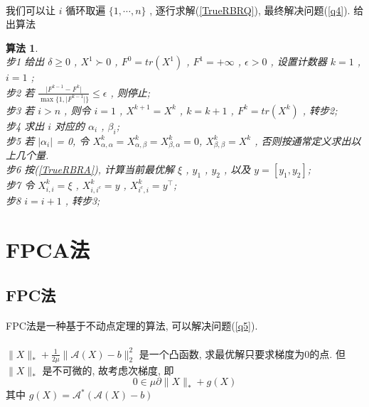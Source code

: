 \documentclass[a4paper, UTF8]{ctexart}				%
\newtheorem{algo}{\bf 算法}
\numberwithin{equation}{section}				%
\begin{document}
			\paragraph{}
				\quad 我们可以让 $i$ 循环取遍 $\{1, \cdots, n\}$ , 逐行求解(\ref{TrueRBRQ}), 最终解决问题(\ref{q4}). 给出算法
				\begin{algo}
					\quad\\
					步1 \quad 给出 $\delta \ge 0$ , $X^1 \succ 0$ , $F^0 = tr(X^1)$ , $F^1 = + \infty$ , $\epsilon > 0$ , 设置计数器 $k = 1$ , $i = 1$ ;\\
					步2 \quad 若 $\frac{\lvert{F^{k - 1}-F^k}\rvert}{\max\{1,\lvert{F^{k - 1}}\rvert\}}\leq\epsilon$ , 则停止;\\
					步3 \quad 若 $i>n$ , 则令 $i=1$ , $X^{k + 1}=X^k$ , $k=k + 1$ , $F^k = tr(X^k)$ , 转步2;\\
					步4 \quad 求出 $i$ 对应的 $\alpha_i$ , $\beta_i$;\\
					步5 \quad 若 $\vert{\alpha_i}\vert$ = 0, 令 $X^k_{\alpha, \alpha} = X^k_{\alpha, \beta} = X^k_{\beta, \alpha} = 0$, $X^k_{\beta, \beta} = X^k$ , 否则按通常定义求出以上几个量.\\
					步6 \quad 按(\ref{TrueRBRA}), 计算当前最优解 $\xi$ , $y_1$ , $y_2$ , 以及 $y = [y_1, y_2]$;\\
					步7 \quad 令 $X^{k}_{i, i} = \xi$ , $X^{k}_{i, i^c} = y$ , $X^{k}_{i^c, i} = y^\top$;\\
					步8 \quad $i = i + 1$ , 转步3;
				\end{algo}


		\section{FPCA法}
		\subsection{FPC法}
			\paragraph{}
				\quad FPC法是一种基于不动点定理的算法, 可以解决问题(\ref{q5}). 

			\paragraph{}
				\quad $\lVert{X}\rVert_*+\frac{1}{2\mu}\lVert{\mathcal{A}(X)-b}\rVert_2^2$ 是一个凸函数, 求最优解只要求梯度为0的点. 但 $\lVert{X}\rVert_*$ 是不可微的, 故考虑次梯度, 即
				\begin{equation}\label{SubGrad}
					0 \in \mu \partial \lVert{X}\rVert_* + g(X)
				\end{equation}
				其中 $g(X) = \mathcal{A}^*(\mathcal{A}(X) - b)$
			
\end{document}
